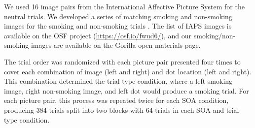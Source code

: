 \documentclass[empirical, authordate]{jote-new-article}
\begin{document}
We used 16 image pairs from the International Affective Picture System \parencite{Lang2008} for the neutral trials. We developed a series of matching smoking and non-smoking images for the smoking and non-smoking trials \parencite{Bartlett2020}. The list of IAPS images is available on the OSF project (\url{https://osf.io/fwud6/}), and our smoking/non-smoking images are available on the Gorilla open materials page.

The trial order was randomized with each picture pair presented four times to cover each combination of image (left and right) and dot location (left and right). This combination determined the trial type condition, where a left smoking image, right non-smoking image, and left dot would produce a smoking trial. For each picture pair, this process was repeated twice for each SOA condition, producing 384 trials split into two blocks with 64 trials in each SOA and trial type condition.
\end{document}
